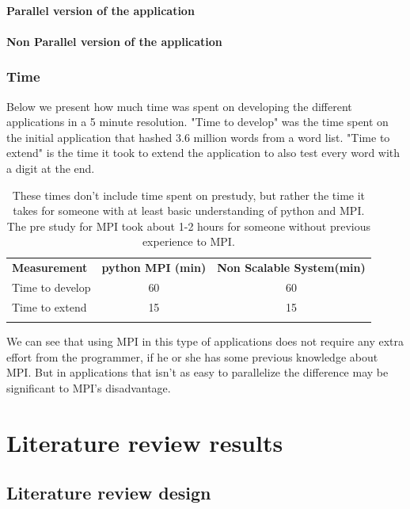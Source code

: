 \documentclass{article}
\begin{document}
\paragraph{Parallel version of the application}
{\small}
\paragraph{Non Parallel version of the application}
{\small}

\subsubsection{Time}
Below we present how much time was spent on developing the different
applications in a 5 minute resolution. "Time to develop" was the time spent on
the initial application that hashed 3.6 million words from a word list. "Time
to extend" is the time it took to extend the application to also test every
word with a digit at the end.

\begin{table}[H]
\begin{tabular}{l c c}
  \rowcolor[gray]{0.5}
  {\bf Measurement} & {\bf python MPI (min)} & {\bf Non Scalable System(min)} \\
  Time to develop &  60  &  60 \\
  Time to extend   &   15  &  15  \\
\rowcolor[gray]{0.5}
\end{tabular}
\caption{ These times don't include time spent on prestudy, but rather the time
it takes for someone with at least basic understanding of python and MPI. The
pre study for MPI took about 1-2 hours for someone without previous experience
to MPI.}
\end{table}

We can see that using MPI in this type of applications does not require any
extra effort from the programmer, if he or she has some previous knowledge
about MPI.  But in applications that isn't as easy to parallelize the
difference may be significant to MPI's disadvantage.

 
\section{Literature review results}

\subsection{Literature review design}
\end{document}

